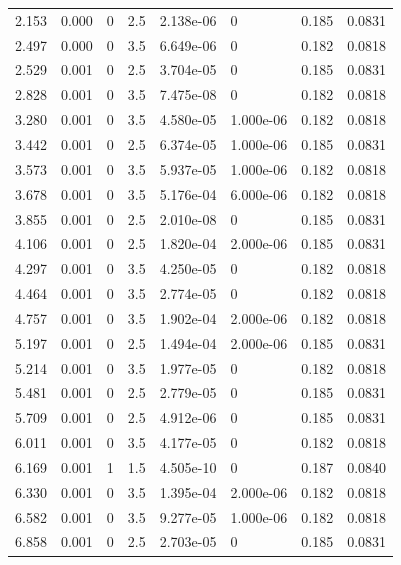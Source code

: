 \documentclass[preview]{standalone}
\begin{document}
{{\begin{tabular}{L{1.2cm}C{1.2cm} C{0.3cm}C{0.5cm} C{1.4cm}C{1.4cm} C{1.4cm}C{1.4cm}}
  2.153  &  0.000  & 0     & 2.5 &  2.138e-06  & 0  & 0.185 &  0.0831   \\ 
  2.497  &  0.000  & 0     & 3.5 &  6.649e-06  & 0  & 0.182 &  0.0818   \\ 
  2.529  &  0.001  & 0     & 2.5 &  3.704e-05  & 0  & 0.185 &  0.0831   \\ 
  2.828  &  0.001  & 0     & 3.5 &  7.475e-08  & 0  & 0.182 &  0.0818   \\ 
  3.280  &  0.001  & 0     & 3.5 &  4.580e-05  & 1.000e-06  & 0.182 &  0.0818   \\ 
  3.442  &  0.001  & 0     & 2.5 &  6.374e-05  & 1.000e-06  & 0.185 &  0.0831   \\ 
  3.573  &  0.001  & 0     & 3.5 &  5.937e-05  & 1.000e-06  & 0.182 &  0.0818   \\ 
  3.678  &  0.001  & 0     & 3.5 &  5.176e-04  & 6.000e-06  & 0.182 &  0.0818   \\ 
  3.855  &  0.001  & 0     & 2.5 &  2.010e-08  & 0  & 0.185 &  0.0831   \\ 
  4.106  &  0.001  & 0     & 2.5 &  1.820e-04  & 2.000e-06  & 0.185 &  0.0831   \\ 
  4.297  &  0.001  & 0     & 3.5 &  4.250e-05  & 0  & 0.182 &  0.0818   \\ 
  4.464  &  0.001  & 0     & 3.5 &  2.774e-05  & 0  & 0.182 &  0.0818   \\ 
  4.757  &  0.001  & 0     & 3.5 &  1.902e-04  & 2.000e-06  & 0.182 &  0.0818   \\ 
  5.197  &  0.001  & 0     & 2.5 &  1.494e-04  & 2.000e-06  & 0.185 &  0.0831   \\ 
  5.214  &  0.001  & 0     & 3.5 &  1.977e-05  & 0  & 0.182 &  0.0818   \\ 
  5.481  &  0.001  & 0     & 2.5 &  2.779e-05  & 0  & 0.185 &  0.0831   \\ 
  5.709  &  0.001  & 0     & 2.5 &  4.912e-06  & 0  & 0.185 &  0.0831   \\ 
  6.011  &  0.001  & 0     & 3.5 &  4.177e-05  & 0  & 0.182 &  0.0818   \\ 
  6.169  &  0.001  & 1     & 1.5 &  4.505e-10  & 0  & 0.187 &  0.0840   \\ 
  6.330  &  0.001  & 0     & 3.5 &  1.395e-04  & 2.000e-06  & 0.182 &  0.0818   \\ 
  6.582  &  0.001  & 0     & 3.5 &  9.277e-05  & 1.000e-06  & 0.182 &  0.0818   \\ 
  6.858  &  0.001  & 0     & 2.5 &  2.703e-05  & 0  & 0.185 &  0.0831   \\ 

\end{tabular}}}
\end{document}
